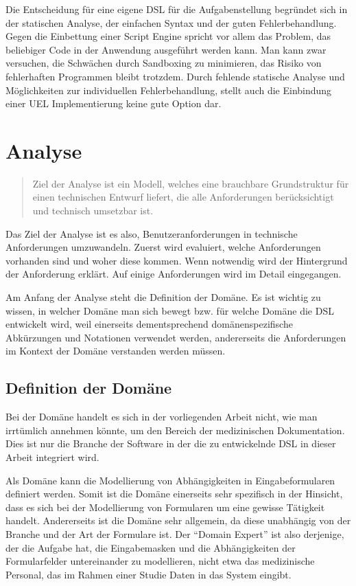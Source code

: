 Die Entscheidung für eine eigene DSL für die Aufgabenstellung begründet sich in der statischen Analyse, der einfachen Syntax und der guten Fehlerbehandlung. Gegen die Einbettung einer Script Engine spricht vor allem das Problem, das beliebiger Code in der Anwendung ausgeführt werden kann. Man kann zwar versuchen, die Schwächen durch Sandboxing zu minimieren, das Risiko von fehlerhaften Programmen bleibt trotzdem. Durch fehlende statische Analyse und Möglichkeiten zur individuellen Fehlerbehandlung, stellt auch die Einbindung einer UEL Implementierung keine gute Option dar.

\chapter{Analyse}
\label{chapter_analyse}

\begin{quote}
Ziel der Analyse ist ein Modell, welches eine brauchbare Grundstruktur für einen technischen Entwurf liefert, die alle Anforderungen berücksichtigt und technisch umsetzbar ist. \cite{ZuGr04}
\end{quote}

Das Ziel der Analyse ist es also, Benutzeranforderungen in technische Anforderungen umzuwandeln. Zuerst wird evaluiert, welche Anforderungen vorhanden sind und woher diese kommen. Wenn notwendig wird der Hintergrund der Anforderung erklärt. Auf einige Anforderungen wird im Detail eingegangen.

Am Anfang der Analyse steht die Definition der Domäne. Es ist wichtig zu wissen, in welcher Domäne man sich bewegt bzw. für welche Domäne die DSL entwickelt wird, weil einerseits dementsprechend domänenspezifische Abkürzungen und Notationen verwendet werden, andererseits die Anforderungen im Kontext der Domäne verstanden werden müssen.


\section{Definition der Domäne}

Bei der Domäne handelt es sich in der vorliegenden Arbeit nicht, wie man irrtümlich annehmen könnte, um den Bereich der medizinischen Dokumentation. Dies ist nur die Branche der Software in der die zu entwickelnde DSL in dieser Arbeit integriert wird. 

Als Domäne kann die Modellierung von Abhängigkeiten in Eingabeformularen definiert werden. Somit ist die Domäne einerseits sehr spezifisch in der Hinsicht, dass es sich bei der Modellierung von Formularen um eine gewisse Tätigkeit handelt. Andererseits ist die Domäne sehr allgemein, da diese unabhängig von der Branche und der Art der Formulare ist. Der ``Domain Expert''\cite{MeHe05} ist also derjenige, der die Aufgabe hat, die Eingabemasken und die Abhängigkeiten der Formularfelder untereinander zu modellieren, nicht etwa das medizinische Personal, das im Rahmen einer Studie Daten in das System eingibt.


